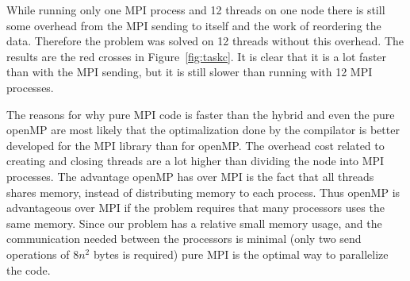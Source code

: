 While running only one MPI process and 12 threads on one node there is still some overhead from the MPI sending to itself and the work of reordering the data. Therefore the problem was solved on 12 threads without this overhead. The results are the red crosses in Figure~\ref{fig:taskc}. It is clear that it is a lot faster than with the MPI sending, but it is still slower than running with 12 MPI processes. 

The reasons for why pure MPI code is faster than the hybrid and even the pure openMP are most likely that the optimalization done by the compilator is better developed for the MPI library than for openMP. The overhead cost related to creating and closing threads are a lot higher than dividing the node into MPI processes. The advantage openMP has over MPI is the fact that all threads shares memory, instead of distributing memory to each process. Thus openMP is advantageous over MPI if the problem requires that many processors uses the same memory. Since our problem has a relative small memory usage, and the communication needed between the processors is minimal (only two send operations of $8n^2$ bytes is required) pure MPI is the optimal way to parallelize the code.  
\\
